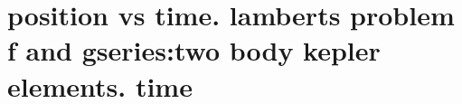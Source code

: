 \section{ position vs time. lamberts problem f and gseries:two body kepler elements. time  }\label{sec:q3}    
